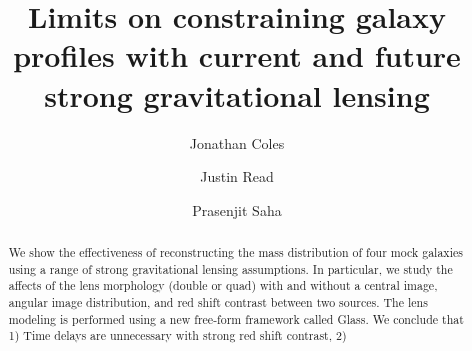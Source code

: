 \documentclass[onecolumn,galley]{mn2e}
\title{Limits on constraining galaxy profiles with current and future strong gravitational lensing}
\author{%
Jonathan Coles 
\and 
Justin Read
\and 
Prasenjit Saha 
}
\newcommand{\Glass}{{\sc Glass}}
\begin{document}
\maketitle


\begin{abstract}
We show the effectiveness of reconstructing the mass distribution of four mock galaxies using
a range of strong gravitational lensing assumptions. In particular, we study
the affects of the lens morphology (double or quad) with and without a central
image, angular image distribution, and red shift contrast between two sources.
The lens modeling is performed using a new free-form framework called \Glass.
We conclude that 
1) Time delays are unnecessary with strong red shift contrast,
2)





\end{abstract}
\end{document}
